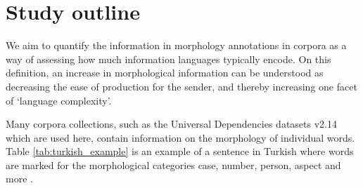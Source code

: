 \documentclass[USenglish]{article}
\begin{document}




\FloatBarrier
\section{Study outline}
We aim to quantify the information in morphology annotations in corpora as a way of assessing how much information languages typically encode.
On this definition, an increase in morphological information can be understood as decreasing the ease of production for the sender, and thereby increasing one facet of `language complexity'.

Many corpora collections, such as the Universal Dependencies datasets v2.14 \citep{UD_2.14} which are used here, contain information on the morphology of individual words. 
Table \ref{tab:turkish_example} is an example of a sentence in Turkish where words are marked for the morphological categories case, number, person, aspect and more \citep{kuzgun_2020_UD_turkish_penn}.
\end{document}
